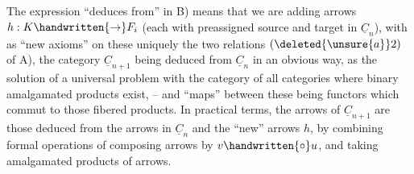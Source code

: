 
The expression ``deduces from'' in B) means that we are adding arrows $h:K\handwritten{\to}F_i$ (each with preassigned source and target in $\underline{C}_n$), with as ``new axioms'' on  these uniquely the two relations $(\deleted{\unsure{a}}2)$ of A), the category $\underline{C}_{n+1}$ being deduced from $\underline{C}_n$ in an obvious way, as the solution of a universal problem with the category of all categories where binary amalgamated products exist, -- and ``maps'' between these being functors which commut to those fibered products.
In practical terms, the arrows of $\underline{C}_{n+1}$ are those deduced from the arrows in $\underline{C}_n$ and the ``new'' arrows $h$, by combining formal operations of composing arrows by $v\handwritten{\circ}u$, and taking  amalgamated products of arrows. 

